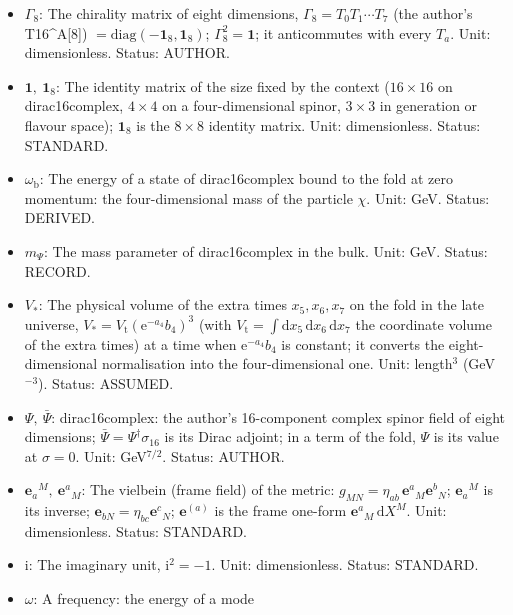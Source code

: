 \documentclass[
  10pt,
]{article}
\begin{document}
\begin{itemize}
  \(P_{\mathrm{R}} = (\mathbf{1} + \Gamma_8)/2\). Unit: dimensionless.
  Status: AUTHOR.
\item
  \(\Gamma_8\): The chirality matrix of eight dimensions,
  \(\Gamma_8 = T_0T_1\cdots T_7\) (the author's T16\^{}A{[}8{]})
  \(= \mathrm{diag}(-\mathbf{1}_8, \mathbf{1}_8)\);
  \(\Gamma_8^2 = \mathbf{1}\); it anticommutes with every \(T_a\). Unit:
  dimensionless. Status: AUTHOR.
\item
  \(\mathbf{1},\ \mathbf{1}_8\): The identity matrix of the size fixed
  by the context (\(16 \times 16\) on dirac16complex, \(4 \times 4\) on
  a four-dimensional spinor, \(3 \times 3\) in generation or flavour
  space); \(\mathbf{1}_8\) is the \(8 \times 8\) identity matrix. Unit:
  dimensionless. Status: STANDARD.
\item
  \(\omega_{\mathrm{b}}\): The energy of a state of dirac16complex bound
  to the fold at zero momentum: the four-dimensional mass of the
  particle \(\chi\). Unit: GeV. Status: DERIVED.
\item
  \(m_\Psi\): The mass parameter of dirac16complex in the bulk. Unit:
  GeV. Status: RECORD.
\item
  \(V_*\): The physical volume of the extra times \(x_5, x_6, x_7\) on
  the fold in the late universe,
  \(V_* = V_{\mathrm{t}}(\mathrm{e}^{-a_4}b_4)^3\) (with
  \(V_{\mathrm{t}} = \int\mathrm{d}x_5\,\mathrm{d}x_6\,\mathrm{d}x_7\)
  the coordinate volume of the extra times) at a time when
  \(\mathrm{e}^{-a_4}b_4\) is constant; it converts the
  eight-dimensional normalisation into the four-dimensional one. Unit:
  length\(^3\) (GeV\(^{-3}\)). Status: ASSUMED.
\item
  \(\Psi,\ \bar\Psi\): dirac16complex: the author's 16-component complex
  spinor field of eight dimensions;
  \(\bar\Psi = \Psi^\dagger\sigma_{16}\) is its Dirac adjoint; in a term
  of the fold, \(\Psi\) is its value at \(\sigma = 0\). Unit:
  GeV\(^{7/2}\). Status: AUTHOR.
\item
  \(\mathbf{e}_a{}^M,\ \mathbf{e}^a{}_M\): The vielbein (frame field) of
  the metric: \(g_{MN} = \eta_{ab}\,\mathbf{e}^a{}_M\mathbf{e}^b{}_N\);
  \(\mathbf{e}_a{}^M\) is its inverse;
  \(\mathbf{e}_{bN} = \eta_{bc}\mathbf{e}^c{}_N\); \(\mathbf{e}^{(a)}\)
  is the frame one-form \(\mathbf{e}^a{}_M\,\mathrm{d}X^M\). Unit:
  dimensionless. Status: STANDARD.
\item
  \(\mathrm{i}\): The imaginary unit, \(\mathrm{i}^2 = -1\). Unit:
  dimensionless. Status: STANDARD.
\item
  \(\omega\): A frequency: the energy of a mode

\end{itemize}
\end{document}
